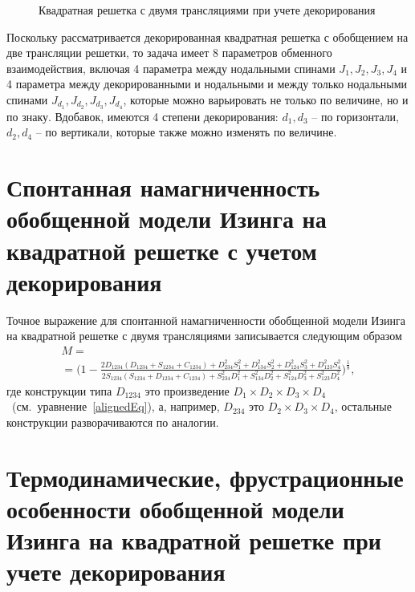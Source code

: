  \begin{figure}[h]
	\caption{Квадратная решетка с двумя трансляциями при учете декорирования}
	\label{squareDecor}
\end{figure}

Поскольку рассматривается декорированная квадратная решетка с обобщением на две трансляции решетки, то задача имеет 8 параметров обменного взаимодействия, включая 4 параметра между нодальными спинами $J_1, J_2, J_3, J_4$ и 4 параметра между декорированными и нодальными и между только нодальными спинами $J_{d_1}, J_{d_2}, J_{d_3}, J_{d_4}$, которые можно варьировать не только по величине, но и по знаку. Вдобавок, имеются 4 степени декорирования: $d_1, d_3$ -- по горизонтали, $d_2, d_4$ -- по вертикали, которые также можно изменять по величине. 


\section{Спонтанная намагниченность обобщенной модели Изинга на квадратной решетке с учетом декорирования}

Точное выражение для спонтанной намагниченности обобщенной модели Изинга на квадратной решетке с двумя трансляциями записывается следующим образом
\begin{multline}
	M = \\ = \Big(1- \frac{2D_{1234}(D_{1234}+S_{1234}+C_{1234})+D_{234}^2S_1^2+D_{134}^2S_2^2+D_{124}^2S_3^2+D_{123}^2S_4^2}{2S_{1234}(S_{1234}+D_{1234}+C_{1234})+S_{234}^2D_1^2+S_{134}^2D_2^2+S_{124}^2D_3^2+S_{123}^2D_4^2}\Big)^{\frac{1}{8}},
\end{multline}
где конструкции типа $D_{1234}$ это произведение $D_1\times D_2\times D_3\times D_4$~(см.~уравнение~\ref{alignedEq}), а, например, $D_{234}$ это $D_2 \times D_3 \times D_4$, остальные конструкции разворачиваются по аналогии.

\section{Термодинамические, фрустрационные особенности обобщенной модели Изинга на квадратной решетке при учете декорирования}

